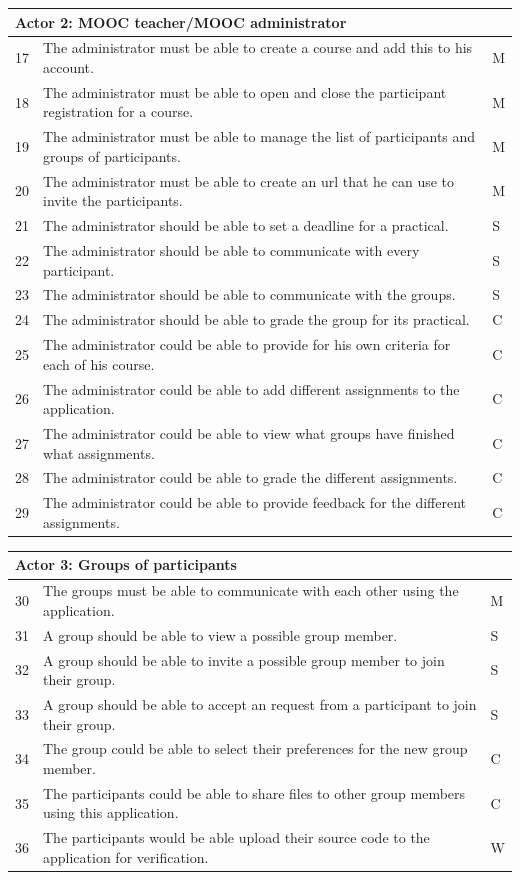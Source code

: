 \begin{tabular}{ | p{0.5cm} | p{12cm} | p{2cm} | }
\hline
\multicolumn{3}{|p{14.5cm}|}{\textbf{Actor 2: MOOC teacher/MOOC administrator}} \\ \hline
17 & The administrator must be able to create a course and add this to his account. & M \\ \hline
18 & The administrator must be able to open and close the participant registration for a course. & M \\ \hline
19 & The administrator must be able to manage the list of participants and groups of participants. & M \\ \hline
20 & The administrator must be able to create an url that he can use to invite the participants. & M \\ \hline
21 & The administrator should be able to set a deadline for a practical. & S \\ \hline
22 & The administrator should be able to communicate with every participant. & S \\ \hline
23 & The administrator should be able to communicate with the groups. & S \\ \hline
24 & The administrator should be able to grade the group for its practical. & C \\ \hline
25 & The administrator could be able to provide for his own criteria for each of his course. & C \\ \hline
26 & The administrator could be able to add different assignments to the application. & C \\ \hline
27 & The administrator could be able to view what groups have finished what assignments. & C \\ \hline
28 & The administrator could be able to grade the different assignments. & C \\ \hline
29 & The administrator could be able to provide feedback for the different assignments. & C \\ \hline
\end{tabular}
\begin{tabular}{ | p{0.5cm} | p{12cm} | p{2cm} | }
\hline
\multicolumn{3}{|p{14.5cm}|}{\textbf{Actor 3: Groups of participants}} \\ \hline
30 & The groups must be able to communicate with each other using the application. & M \\ \hline
31 & A group should be able to view a possible group member. & S \\ \hline
32 & A group should be able to invite a possible group member to join their group. & S \\ \hline
33 & A group should be able to accept an request from a participant to join their group. & S \\ \hline
34 & The group could be able to select their preferences for the new group member. & C \\ \hline
35 & The participants could be able to share files to other group members using this application. & C \\ \hline
36 & The participants would be able upload their source code to the application for verification. & W \\
\hline
\end{tabular}

